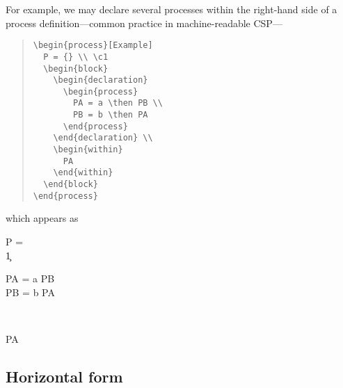 \documentclass[fleqn,a4paper]{article}
\begin{document}
For example, we may declare several processes within the right-hand
side of a process definition---common practice in machine-readable
CSP---
\begin{quote}
\begin{verbatim}
\begin{process}[Example]
  P = {} \\ \c1 
  \begin{block}
    \begin{declaration}
      \begin{process}
        PA = a \then PB \\
        PB = b \then PA
      \end{process}
    \end{declaration} \\
    \begin{within}
      PA
    \end{within}
  \end{block}
\end{process}
\end{verbatim}
\end{quote}
which appears as 
\begin{process}[Example]
  P = {} \\ \c1 
  \begin{block}
    \begin{declaration}
      \begin{process}
        PA = a \then PB \\
        PB = b \then PA
      \end{process}
    \end{declaration} \\
    \begin{within}
      PA
    \end{within} 
  \end{block}
\end{process}

\subsection{Horizontal form}
\end{document}
